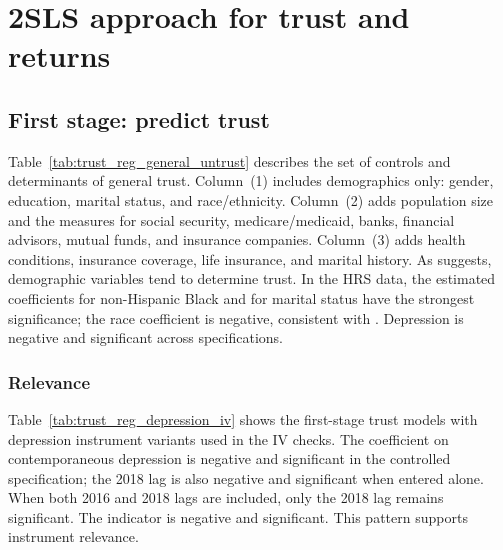 \onlyinsubfile{\setcounter{section}{4}}
\section{2SLS approach for trust and returns}\notinsubfile{\label{sec:2sls}}

\subsection{First stage: predict trust}

\par Table~\ref{tab:trust_reg_general_untrust} describes the set of controls and determinants of general trust. Column~(1) includes demographics only: gender, education, marital status, and race/ethnicity. Column~(2) adds population size and the  measures for social security, medicare/medicaid, banks, financial advisors, mutual funds, and insurance companies. Column~(3) adds health conditions, insurance coverage, life insurance, and marital history. As \cite{Alesina2000} suggests, demographic variables tend to determine trust. In the HRS data, the estimated coefficients for non-Hispanic Black and for marital status have the strongest significance; the race coefficient is negative, consistent with \cite{Alsan2018}. Depression is negative and significant across specifications.

\label{tab:trust_reg_general_untrust}
\FloatBarrier

\subsubsection{Relevance}

\par Table~\ref{tab:trust_reg_depression_iv} shows the first-stage trust models with depression instrument variants used in the IV checks. The coefficient on contemporaneous depression is negative and significant in the controlled specification; the 2018 lag is also negative and significant when entered alone. When both 2016 and 2018 lags are included, only the 2018 lag remains significant. The  indicator is negative and significant. This pattern supports instrument relevance.

\label{tab:trust_reg_depression_iv}
\FloatBarrier

